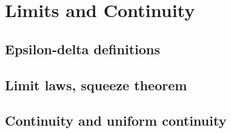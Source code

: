 
\section{Limits and Continuity}

\subsection{Epsilon-delta definitions}


\subsection{Limit laws, squeeze theorem}


\subsection{Continuity and uniform continuity}

